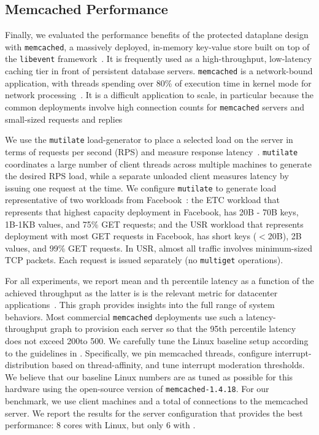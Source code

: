 
\subsection{Memcached Performance}
\label{sec:eval:memcached}




Finally, we evaluated the performance benefits of the \ix protected
dataplane design with \texttt{memcached}, a massively deployed,
in-memory key-value store built on top of the \texttt{libevent}
framework~\cite{url:memcached}. It is frequently used as a
high-throughput, low-latency caching tier in front of persistent
database servers. \texttt{memcached} is a network-bound application,
with threads spending over 80\% of execution time in kernel mode for
network processing~\cite{DBLP:conf/eurosys/LeverichK14}. It is a difficult
application to scale, in particular because the common deployments
involve high connection counts for \texttt{memcached} servers and
small-sized requests and
replies~\cite{DBLP:conf/nsdi/NishtalaFGKLLMPPSSTV13,Atikoglu:2012:WAL}

We use the \texttt{mutilate} load-generator to place a selected load
on the server in terms of requests per second (RPS) and measure
response latency~\cite{url:mutilate}. \texttt{mutilate} coordinates a
large number of client threads across multiple machines to generate
the desired RPS load, while a separate unloaded client measures
latency by issuing one request at the time.  We configure
\texttt{mutilate} to generate load representative of two workloads
from Facebook~\cite{Atikoglu:2012:WAL}: the ETC workload that
represents that highest capacity deployment in Facebook, has 20B - 70B
keys, 1B-1KB values, and 75\% GET requests; and the USR workload that
represents deployment with most GET requests in Facebook, has short
keys ($<$20B), 2B values, and 99\% GET requests. In USR, almost all
traffic involves minimum-sized TCP packets. Each request is issued
separately (no \texttt{multiget} operations).


For all experiments, we report mean and th percentile latency as
a function of the achieved throughput as the latter is is the relevant metric
for datacenter applications~\cite{DBLP:journals/cacm/DeanB13}. This
graph provides insights into the full range of system behaviors. Most
commercial \texttt{memcached} deployments use such a
latency-throughput graph to provision each server so that the 95th 
percentile latency does not exceed 200\microsecond to 500\microsecond.
We carefully tune the Linux baseline setup according to the guidelines
in \cite{DBLP:conf/eurosys/LeverichK14}. Specifically, we pin memcached threads,
configure interrupt-distribution based on thread-affinity, and tune
interrupt moderation thresholds. We believe that our baseline Linux
numbers are as tuned as possible for this hardware using the
open-source version of \texttt{memcached-1.4.18}. For our benchmark,
we use  client machines  and a total of  connections to the
memcached server.  We report the results for the server configuration
that provides the best performance: 8 cores with Linux, but only 6
with \ix.

